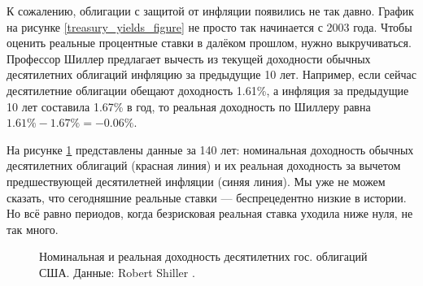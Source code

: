 К сожалению, облигации с защитой от инфляции появились не так давно. График на 
рисунке \ref{treasury_yields_figure} не просто так начинается с 2003 года. 
Чтобы оценить реальные процентные ставки в далёком прошлом, нужно 
выкручиваться. Профессор Шиллер предлагает вычесть из текущей доходности 
обычных десятилетних облигаций инфляцию за предыдущие 10 лет. Например, если 
сейчас десятилетние облигации обещают доходность 1.61\%, а инфляция за 
предыдущие 10 лет составила 1.67\% в год, то реальная доходность по Шиллеру 
равна $1.61\% - 1.67\% = -0.06\%$.

На рисунке \ref{long_run_interest_rates} представлены данные за 140 лет: 
номинальная доходность обычных десятилетних облигаций (красная линия) и их 
реальная доходность за вычетом предшествующей десятилетней инфляции (синяя 
линия). Мы уже не можем сказать, что сегодняшние реальные ставки 
--- беспрецедентно низкие в истории. Но всё равно периодов, когда безрисковая 
реальная ставка уходила ниже нуля, не так много.



\begin{figure}[ht]
\centering
{}
\caption{Номинальная и реальная доходность десятилетних гос. облигаций США. 
Данные: Robert Shiller \cite{shillerOnline}.}
\label{long_run_interest_rates}
\end{figure}

